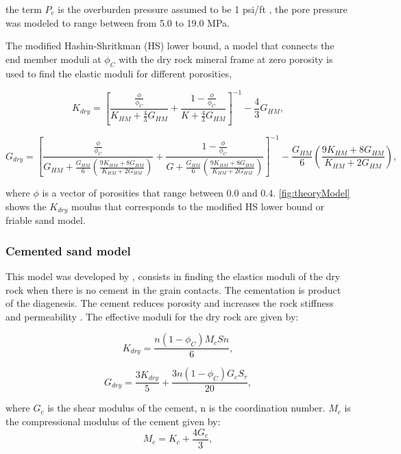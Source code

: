 the term $P_{c}$ is the overburden pressure assumed to be 1 psi/ft \citep{ref:sidra}, the pore pressure 
was modeled to range between from 5.0 to 19.0 MPa.

The modified Hashin-Shritkman (HS) lower bound, a model that connects the end member moduli at $\phi_{C}$ with 
the dry rock mineral frame at zero porosity is used to find the elastic moduli for different porosities,

\begin{equation}
K_{dry}=\left[\frac{\frac{\phi}{\phi_{C}}}{K_{HM}+\frac{4}{3}G_{HM}}+\frac{1-\frac{\phi}{\phi_{C}}}{K+\frac{4}{3}G_{HM}}\right]^{-1}-\frac{4}{3}G_{HM},
  \label{eq:kdry}
\end{equation}

\begin{equation}
G_{dry}=\left[\frac{\frac{\phi}{\phi_{C}}}{G_{HM}+\frac{G_{HM}}{6}\left(\frac{9K_{HM}+8G_{HM}}{K_{HM}+2G_{HM}}\right)}+\frac{1-\frac{\phi}{\phi_{C}}}{G+\frac{G_{HM}}{6}\left(\frac{9K_{HM}+8G_{HM}}{K_{HM}+2G_{HM}}\right)}\right]^{-1}-\frac{G_{HM}}{6}\left(\frac{9K_{HM}+8G_{HM}}{K_{HM}+2G_{HM}}\right),
  \label{eq:kdry}
\end{equation}

where $\phi$ is a vector of porosities that range between 0.0 and 0.4. \ref{fig:theoryModel}
 shows the $K_{dry}$ moulus that corresponds to the modified HS lower bound or friable sand model.

\subsubsection{Cemented sand model}

This model was developed by \cite{ref:dvorkin2}, consists in finding the elastics moduli 
of the dry rock when there is no cement in the grain contacts. The cementation is product
of the diagenesis. The cement reduces porosity and increases the rock stiffness and permeability \citep{ref:avseth}. The effective moduli for the dry rock are given by: 


\begin{equation}
K_{dry}=\frac{n(1-\phi_{C})M_{c}S{n}}{6},
  \label{eq:kdryc}
\end{equation}

\begin{equation}
G_{dry}=\frac{3K_{dry}}{5}+\frac{3n(1-\phi_{C})G_{c}S_{\tau}}{20},
  \label{eq:kdryc}
\end{equation}

where $G_{c}$ is the shear modulus of the cement, n is the coordination number. $M_{c}$ is the compressional modulus of the cement given by:
\begin{equation}
M_{c}=K_{c}+\frac{4G_{c}}{3},
  \label{eq:mc}
\end{equation}

